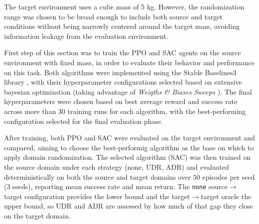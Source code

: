 The target environment uses a cube mass of 5 kg. However, the randomization range was chosen to be broad enough to include both source and target conditions without being narrowly centered around the target mass, avoiding information leakage from the evaluation environment.

First step of this section was to train the PPO and SAC agents on the source environment with fixed mass, in order to evaluate their behavior and performance on this task.
Both algorithms were implemented using the Stable Baselines3 library \cite{stable-baselines3}, with their hyperparameter configurations selected based on extensive bayesian optimization (taking advantage of \textit{Weigths \& Biases Sweeps \cite{wandb}}).
The final hyperparameters were chosen based on best average reward and success rate across more than 30 training runs for each algorithm, with the best-performing configuration selected for the final evaluation phase.

After training, both PPO and SAC were evaluated on the target environment and compared, aiming to choose the best-performig algorithm as the base on which to apply domain randomization.
The selected algorithm (SAC) was then trained on the source domain under each strategy (none, UDR, ADR) and evaluated deterministically on both the source and target domains over $50$ episodes per seed ($3$ seeds), reporting mean success rate and mean return. The \texttt{none} source$\to$target configuration provides the lower bound and the target$\to$target oracle the upper bound, so UDR and ADR are assessed by how much of that gap they close on the target domain.